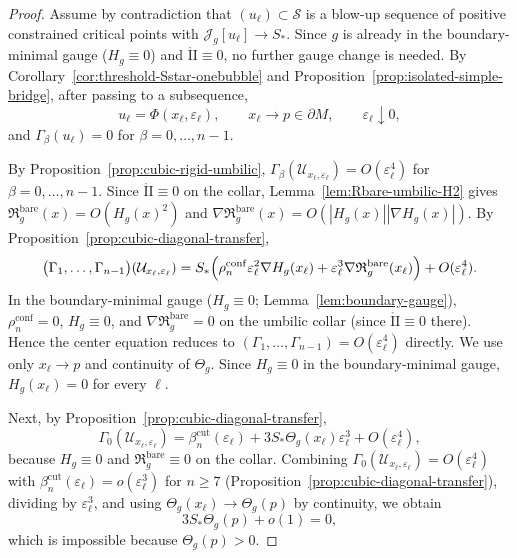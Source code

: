 \documentclass[11pt,reqno,a4paper]{amsart}
\numberwithin{equation}{section}
\theoremstyle{plain}
\theoremstyle{remark}
\theoremstyle{plain}
\begin{document}
\begin{proof}
Assume by contradiction that $(u_\ell)\subset\mathcal S$ is a blow-up sequence of positive constrained critical points with
$\mathcal J_g[u_\ell]\to S_\ast$.
Since $g$ is already in the boundary-minimal gauge ($H_g\equiv0$) and
$\mathring{\mathrm{II}}\equiv0$, no further gauge change is needed.
By Corollary~\ref{cor:threshold-Sstar-onebubble} and Proposition~\ref{prop:isolated-simple-bridge},
after passing to a subsequence,
\[
u_\ell=\Phi(x_\ell,\varepsilon_\ell),
\qquad
x_\ell\to p\in\partial M,
\qquad
\varepsilon_\ell\downarrow0,
\]
and
$\Gamma_\beta(u_\ell)=0$ for $\beta=0,\dots,n-1$.

By Proposition~\ref{prop:cubic-rigid-umbilic},
$\Gamma_\beta(\mathcal U_{x_\ell,\varepsilon_\ell})=O(\varepsilon_\ell^4)$
for $\beta=0,\dots,n-1$.
Since $\mathring{\mathrm{II}}\equiv0$ on the collar, Lemma~\ref{lem:Rbare-umbilic-H2} gives
$\mathfrak R_g^{\mathrm{bare}}(x)=O(H_g(x)^2)$ and
$\nabla\mathfrak R_g^{\mathrm{bare}}(x)=O(|H_g(x)||\nabla H_g(x)|)$.
By Proposition~\ref{prop:cubic-diagonal-transfer},
\[
\bigl(\Gamma_1,\dots,\Gamma_{n-1}\bigr)(\mathcal U_{x_\ell,\varepsilon_\ell})
= S_\ast\Bigl(\rho_n^{\mathrm{conf}}\varepsilon_\ell^2\nabla H_g(x_\ell)
+\varepsilon_\ell^3\nabla\mathfrak R_g^{\mathrm{bare}}(x_\ell)\Bigr)+O(\varepsilon_\ell^4).
\]
In the boundary-minimal gauge ($H_g\equiv0$; Lemma~\ref{lem:boundary-gauge}),
$\rho_n^{\mathrm{conf}}=0$, $H_g\equiv0$, and $\nabla\mathfrak R_g^{\mathrm{bare}}=0$
on the umbilic collar (since $\mathring{\mathrm{II}}\equiv0$ there).
Hence the center equation reduces to
$(\Gamma_1,\dots,\Gamma_{n-1})=O(\varepsilon_\ell^4)$ directly.
We use only $x_\ell\to p$ and continuity of $\Theta_g$.
Since $H_g\equiv0$ in the boundary-minimal gauge, $H_g(x_\ell)=0$ for every
$\ell$.

Next, by Proposition~\ref{prop:cubic-diagonal-transfer},
\[
\Gamma_0(\mathcal U_{x_\ell,\varepsilon_\ell})
=
\beta_n^{\mathrm{cut}}(\varepsilon_\ell)
+
3S_\ast\Theta_g(x_\ell)\varepsilon_\ell^3
+O(\varepsilon_\ell^4),
\]
because $H_g\equiv0$ and $\mathfrak R_g^{\mathrm{bare}}\equiv0$ on the collar.
Combining $\Gamma_0(\mathcal U_{x_\ell,\varepsilon_\ell})=O(\varepsilon_\ell^4)$
with $\beta_n^{\mathrm{cut}}(\varepsilon_\ell)=o(\varepsilon_\ell^3)$ for $n\ge7$
(Proposition~\ref{prop:cubic-diagonal-transfer}),
dividing by $\varepsilon_\ell^3$,
and using $\Theta_g(x_\ell)\to\Theta_g(p)$ by continuity, we obtain
\[
3S_\ast\Theta_g(p) + o(1)=0,
\]
which is impossible because $\Theta_g(p)>0$.
\end{proof}
\end{document}
